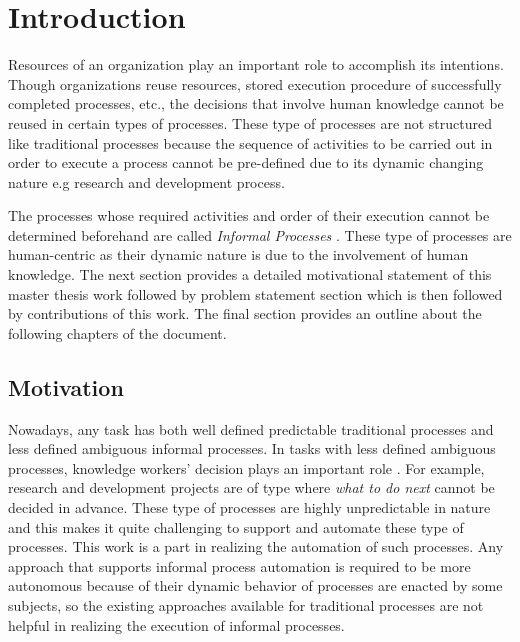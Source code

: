 \chapter{Introduction}
\label{chap:introduction}

Resources of an organization play an important role to accomplish its intentions. Though organizations reuse resources, stored execution procedure of successfully completed processes, etc., the decisions that involve human knowledge cannot be reused in certain types of processes. These type of processes are not structured like traditional processes because the sequence of activities to be carried out in order to execute a process cannot be pre-defined due to its dynamic changing nature e.g research and development process.

The processes whose required activities and order of their execution cannot be determined beforehand are called \textit{Informal Processes} \cite{Sungur2014}. These type of processes are human-centric as their dynamic nature is due to the involvement of human knowledge. The next section provides a detailed motivational statement of this master thesis work followed by problem statement section which is then followed by contributions of this work. The final section provides an outline about the following chapters of the document. 

\section{Motivation}
\label{sec:motivation}
Nowadays, any task has both well defined predictable traditional processes and less defined ambiguous informal processes. In tasks with less defined ambiguous processes, knowledge workers' decision plays an important role \cite{BPTrends2009}. For example, research and development projects are of type where \textit{what to do next} cannot be decided in advance. These type of processes are highly unpredictable in nature and this makes it quite challenging to support and automate these type of processes. This work is a part in realizing the automation of such processes. Any approach that supports informal process automation is required to be more autonomous because of their dynamic behavior of processes are enacted by some subjects, so the existing approaches available for traditional processes are not helpful in realizing the execution of informal processes.  

